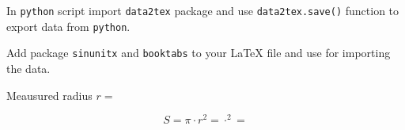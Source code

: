\documentclass[preview]{standalone}
\begin{document}
In \texttt{python} script import \texttt{data2tex} package and
use \verb+data2tex.save()+ function to export data from \texttt{python}.

Add package \texttt{sinunitx}  and \texttt{booktabs} to your \LaTeX{} file
and use \verb++ for importing the data.

Meausured radius $r = $

\[
S = \pi \cdot r^2 =  \cdot ^2 = 
\]



\end{document}
